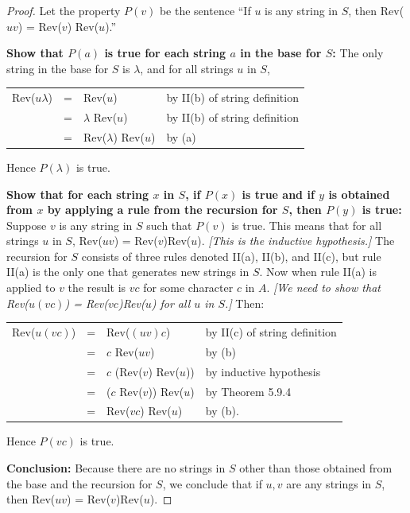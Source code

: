\documentclass[14pt]{extarticle}
\newcommand{\cy}{\color{cyan}}
\begin{document}
\begin{proof}
Let the property $P(v)$ be the sentence “If $u$ is any string in $S$, then Rev($uv$) = Rev($v$) Rev($u$).”

{\bf Show that $P(a)$ is true for each string $a$ in the base for $S$:} The only string in the base for $S$ is 
$\lambda$, and for all strings $u$ in $S$, 
\begin{center}
\begin{tabular}{rcll}
Rev($u \lambda$) & = & Rev($u$) & {\cy by II(b) of string definition} \\
& = & $\lambda$ Rev($u$) & {\cy by II(b) of string definition} \\
& = & Rev($\lambda$) Rev($u$) & {\cy by (a)}
\end{tabular}
\end{center}
Hence $P(\lambda)$ is true. 

{\bf Show that for each string $x$ in $S$, if $P(x)$ is true and if $y$ is obtained from $x$ by applying a rule 
from the recursion for $S$, then $P(y)$ is true:}
Suppose $v$ is any string in $S$ such that $P(v)$ is true. This means that for all strings $u$ in $S$, Rev($uv$) = 
Rev($v$)Rev($u$). {\it [This is the inductive hypothesis.]}
The recursion for $S$ consists of three rules denoted II(a), II(b), and II(c), but rule II(a) is the only one 
that generates new strings in $S$.
Now when rule II(a) is applied to $v$ the result is $vc$ for some character $c$ in $A$. {\it [We need to show that 
Rev($u(vc)$) = Rev($vc$)Rev($u$) for all $u$ in $S$.]} Then:
\begin{center}
\begin{tabular}{rcll}
Rev($u(vc)$) & = & Rev($(uv)c$) & {\cy by II(c) of string definition} \\
& = & $c$ Rev($uv$) & {\cy by (b)} \\
& = & $c$ (Rev($v$) Rev($u$)) & {\cy by inductive hypothesis} \\
& = & ($c$ Rev($v$)) Rev($u$) & {\cy by Theorem 5.9.4} \\
& = & Rev($vc$) Rev($u$) & {\cy by (b).}
\end{tabular}
\end{center}
Hence $P(vc)$ is true.

{\bf Conclusion:} Because there are no strings in $S$ other than those obtained from the base and the recursion for 
$S$, we conclude that if $u, v$ are any strings in $S$, then Rev($uv$) = Rev($v$)Rev($u$).
\end{proof}
\end{document}
